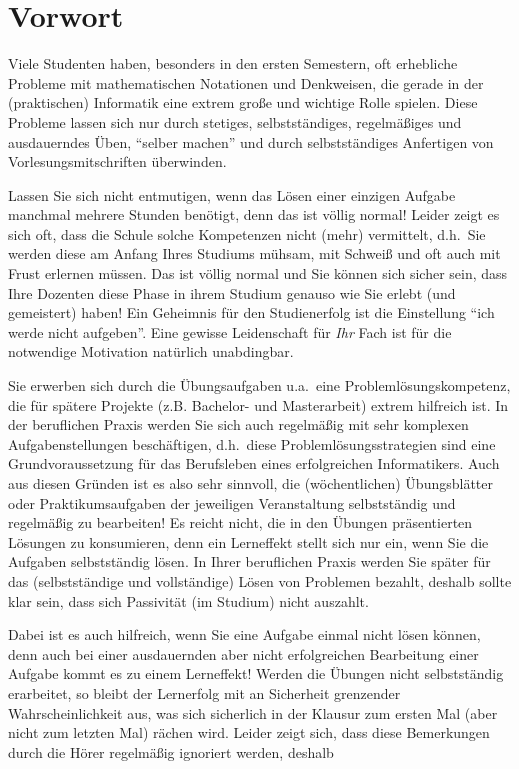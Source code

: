 \section{Vorwort}

Viele Studenten haben, besonders in den ersten Semestern, oft
erhebliche Probleme mit mathematischen Notationen und Denkweisen, die
gerade in der (praktischen) Informatik eine extrem große und wichtige
Rolle spielen. Diese Probleme lassen sich nur durch stetiges,
selbstständiges, regelmäßiges und ausdauerndes Üben, "`selber
machen"' und durch selbstständiges Anfertigen von
Vorlesungsmitschriften überwinden. 

Lassen Sie sich nicht entmutigen, wenn das Lösen einer einzigen
Aufgabe manchmal mehrere Stunden benötigt, denn das ist völlig normal!
Leider zeigt es sich oft, dass die Schule solche Kompetenzen nicht
(mehr) vermittelt, d.h.~Sie werden diese am Anfang Ihres Studiums
mühsam, mit Schweiß und oft auch mit Frust erlernen müssen. Das ist 
völlig normal und Sie können sich sicher sein, dass Ihre Dozenten
diese Phase in ihrem Studium genauso wie Sie erlebt (und gemeistert) 
haben! Ein Geheimnis für den Studienerfolg ist die Einstellung "`ich werde nicht
aufgeben"'. Eine gewisse Leidenschaft für \emph{Ihr} Fach ist für die
notwendige Motivation natürlich unabdingbar. 

Sie erwerben sich durch die Übungsaufgaben u.a.~eine
Problemlösungskompetenz, die für spätere Projekte (z.B. Bachelor- und
Masterarbeit) extrem hilfreich ist. In der beruflichen Praxis werden
Sie sich auch regelmäßig mit sehr komplexen Aufgabenstellungen
beschäftigen, d.h.~diese Problemlösungsstrategien sind eine
Grundvoraussetzung für das Berufsleben eines erfolgreichen
Informatikers. Auch aus diesen Gründen ist es also sehr sinnvoll, die
(wöchentlichen) Übungsblätter oder Praktikumsaufgaben der jeweiligen
Veranstaltung selbstständig und regelmäßig zu bearbeiten! Es reicht
nicht, die in den Übungen präsentierten Lösungen zu konsumieren, denn
ein Lerneffekt stellt sich nur ein, wenn Sie die Aufgaben
selbstständig lösen. In Ihrer beruflichen Praxis werden Sie später
für das (selbstständige und vollständige) Lösen von Problemen bezahlt, deshalb 
sollte klar sein, dass sich Passivität (im Studium)  nicht auszahlt. 
 
Dabei ist es auch hilfreich, wenn Sie eine Aufgabe einmal nicht lösen können,
denn auch bei einer ausdauernden aber nicht erfolgreichen Bearbeitung
einer Aufgabe kommt es zu einem Lerneffekt! Werden die Übungen nicht
selbstständig erarbeitet, so bleibt der Lernerfolg mit an Sicherheit
grenzender Wahrscheinlichkeit aus, was sich sicherlich in der Klausur
zum ersten Mal (aber nicht zum letzten Mal) rächen wird. Leider zeigt
sich, dass diese Bemerkungen durch die Hörer regelmäßig ignoriert
werden, deshalb

